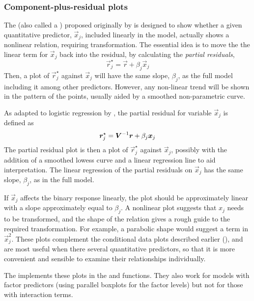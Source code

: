 \documentclass[11pt]{book}\usepackage[]{graphicx}\usepackage[]{color}
\begin{document}
\subsubsection{Component-plus-residual plots}\label{sec:component-plus-residual}
The 
(also called a )
proposed originally by 
\citet{LarsenMcCleary:72} is designed to
show whether a given quantitative predictor, $\vec{x}_j$, included linearly in the model,
actually shows a nonlinear relation, requiring transformation.
The essential idea is to move the the linear term for $\vec{x}_j$ back into
the residual, by calculating the \emph{partial residuals},
\begin{equation*}
\vec{r}_j^{\star} = \vec{r} + \beta_j \vec{x}_j
\end{equation*}
Then, a plot of $\vec{r}_j^{\star}$ against $\vec{x}_j$ will have the same slope,
$\beta_j$, as the full model including it among other predictors.
However, any non-linear trend will be shown in the pattern of the points,
usually aided by a smoothed non-parametric curve.

As adapted to logistic regression by \citet{Landwehr-etal:84},
the partial residual for variable $\vec{x}_j$ is defined as
\begin{equation*}%
\vec{r}_j^{\star} = \mat{V}^{-1} \vec{r} + \beta_j \vec{x}_j
\end{equation*}
The partial residual plot is then a plot of $\vec{r}_j^{\star}$ against
$\vec{x}_j$, possibly with the addition of a smoothed lowess curve
\citep{Fowlkes:87} and
a linear regression line to aid interpretation. The linear regression
of the partial residuals on $\vec{x}_j$
has the same slope, $\beta_j$, as in the full model.

If $\vec{x}_j$ affects the binary response linearly, the plot should be approximately linear with a slope approximately equal to $\beta_j$.
A nonlinear plot suggests that $x_j$ needs to be transformed, and
the shape of the relation gives a rough guide to the required
transformation.
For example, a parabolic shape would suggest a term in $\vec{x}_j^2$.
These plots complement the conditional data plots described earlier
(), and are most useful when there several quantitative predictors,
so that it is more convenient and sensible to examine their relationships individually.

The  implements these plots in the 
and  functions. They also work for models with
factor predictors (using parallel boxplots for the factor levels) but not for those with interaction terms.  
\end{document}
